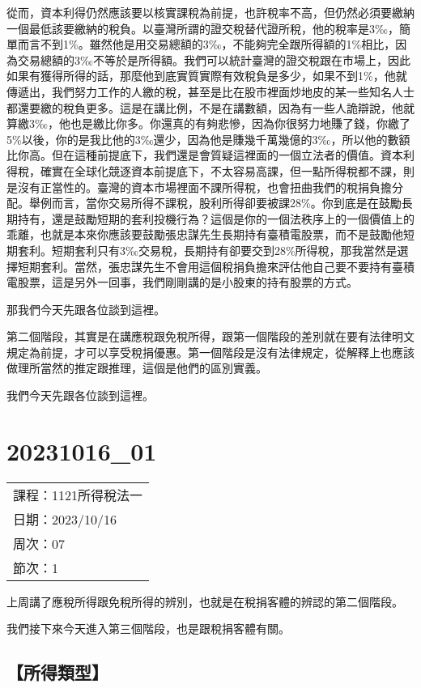 \documentclass[]{ctexbook}
\begin{document}
從而，資本利得仍然應該要以核實課稅為前提，也許稅率不高，但仍然必須要繳納一個最低該要繳納的稅負。以臺灣所謂的證交稅替代證所稅，他的稅率是3‰，簡單而言不到1\%。雖然他是用交易總額的3‰，不能夠完全跟所得額的1\%相比，因為交易總額的3‰不等於是所得額。我們可以統計臺灣的證交稅跟在市場上，因此如果有獲得所得的話，那麼他到底實質實際有效稅負是多少，如果不到1\%，他就傳遞出，我們努力工作的人繳的稅，甚至是比在股市裡面炒地皮的某一些知名人士都還要繳的稅負更多。這是在講比例，不是在講數額，因為有一些人詭辯說，他就算繳3‰，他也是繳比你多。你還真的有夠悲慘，因為你很努力地賺了錢，你繳了5\%以後，你的是我比他的3‰還少，因為他是賺幾千萬幾億的3‰，所以他的數額比你高。但在這種前提底下，我們還是會質疑這裡面的一個立法者的價值。資本利得稅，確實在全球化競逐資本前提底下，不太容易高課，但一點所得稅都不課，則是沒有正當性的。臺灣的資本市場裡面不課所得稅，也會扭曲我們的稅捐負擔分配。舉例而言，當你交易所得不課稅，股利所得卻要被課28\%。你到底是在鼓勵長期持有，還是鼓勵短期的套利投機行為？這個是你的一個法秩序上的一個價值上的乖離，也就是本來你應該要鼓勵張忠謀先生長期持有臺積電股票，而不是鼓勵他短期套利。短期套利只有3‰交易稅，長期持有卻要交到28\%所得稅，那我當然是選擇短期套利。當然，張忠謀先生不會用這個稅捐負擔來評估他自己要不要持有臺積電股票，這是另外一回事，我們剛剛講的是小股東的持有股票的方式。

那我們今天先跟各位談到這裡。

第二個階段，其實是在講應稅跟免稅所得，跟第一個階段的差別就在要有法律明文規定為前提，才可以享受稅捐優惠。第一個階段是沒有法律規定，從解釋上也應該做理所當然的推定跟推理，這個是他們的區別實義。

我們今天先跟各位談到這裡。

\hypertarget{section-11}{%
\chapter{20231016\_01}\label{section-11}}

\begin{longtable}[]{@{}l@{}}
\toprule()
\endhead
課程：1121所得稅法一 \\
日期：2023/10/16 \\
周次：07 \\
節次：1 \\
\bottomrule()
\end{longtable}

上周講了應稅所得跟免稅所得的辨別，也就是在稅捐客體的辨認的第二個階段。

我們接下來今天進入第三個階段，也是跟稅捐客體有關。

\hypertarget{ux6240ux5f97ux985eux578b}{%
\section{【所得類型】}\label{ux6240ux5f97ux985eux578b}}
\end{document}
